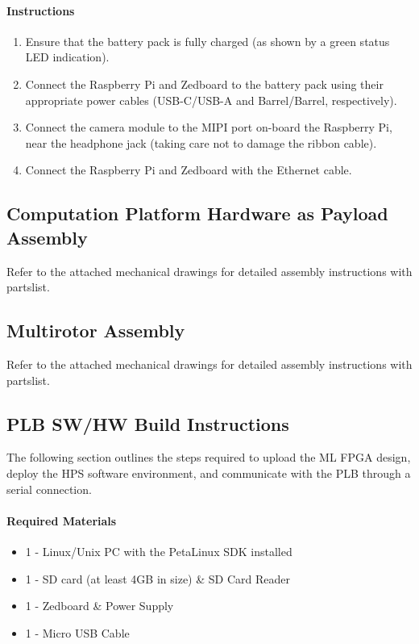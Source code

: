 \documentclass[10pt,letterpaper]{article}
\begin{document}
\paragraph{Instructions}
\begin{enumerate}
\item Ensure that the battery pack is fully charged (as shown by a green status LED indication).
\item Connect the Raspberry Pi and Zedboard to the battery pack using their appropriate power cables (USB-C/USB-A and Barrel/Barrel, respectively).
\item Connect the camera module to the MIPI port on-board the Raspberry Pi, near the headphone jack (taking care not to damage the ribbon cable).
\item Connect the Raspberry Pi and Zedboard with the Ethernet cable.
\end{enumerate}

\subsection{Computation Platform Hardware as Payload Assembly}
Refer to the attached mechanical drawings for detailed assembly instructions with partslist.

\subsection{Multirotor Assembly}
Refer to the attached mechanical drawings for detailed assembly instructions with partslist.

\subsection{PLB SW/HW Build Instructions}
\label{plb_setup}
The following section outlines the steps required to upload the ML FPGA design, deploy the HPS software environment, and communicate with the PLB through a serial connection.

\paragraph{Required Materials}
\begin{itemize}
\item 1 - Linux/Unix PC with the PetaLinux SDK\cite{petalinux} installed
\item 1 - SD card (at least 4GB in size) \& SD Card Reader
\item 1 - Zedboard \& Power Supply
\item 1 - Micro USB Cable
\end{itemize}
\end{document}
